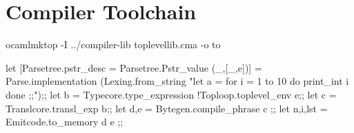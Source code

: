 \section{Compiler Toolchain}

\begin{bashcode}
  ocamlmktop -I ../compiler-lib toplevellib.cma -o to
\end{bashcode}

\begin{ocamlcode}
let
[{Parsetree.pstr_desc = Parsetree.Pstr_value (_,[_,e])}]
= Parse.implementation
    (Lexing.from_string
       "let a = for i = 1 to 10 do print_int i done ;;");;
let b = Typecore.type_expression !Toploop.toplevel_env e;;
let c = Translcore.transl_exp b;;
let d,e = Bytegen.compile_phrase c ;;
let n,i,lst = Emitcode.to_memory d e ;;
\end{ocamlcode}

